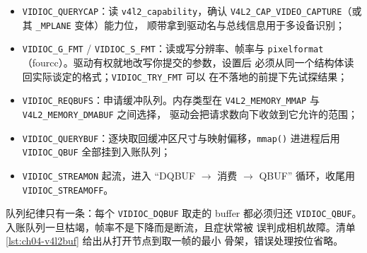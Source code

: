 \documentclass[12pt,a4paper,fontset=fandol]{ctexbook}
\newcommand{\Fn}[1]{\texttt{#1()}}
\newcommand{\Tp}[1]{\texttt{#1}}
\newcommand{\Bk}{\discretionary{}{}{}}
\begin{document}
\begin{itemize}
\item \Tp{VIDIOC\_QUERYCAP}：读 \Tp{v4l2\_capability\Bk}，确认
      \Tp{V4L2\_CAP\_VIDEO\_CAPTURE}（或其 \Tp{\_MPLANE} 变体）能力位，
      顺带拿到驱动名与总线信息用于多设备识别；
\item \Tp{VIDIOC\_G\_FMT} / \Tp{VIDIOC\_S\_FMT}：读或写分辨率、帧率与
      \Tp{pixelformat}（fourcc）。驱动有权就地改写你提交的参数，设置后
      必须从同一个结构体读回实际谈定的格式；\Tp{VIDIOC\_TRY\_FMT} 可以
      在不落地的前提下先试探结果；
\item \Tp{VIDIOC\_{\Bk}REQBUFS}：申请缓冲队列。内存类型在
      \Tp{V4L2\_{\Bk}MEMORY\_{\Bk}MMAP} 与 \Tp{V4L2\_{\Bk}MEMORY\_{\Bk}DMABUF} 之间选择，
      驱动会把请求数向下收敛到它允许的范围；
\item \Tp{VIDIOC\_{\Bk}QUERYBUF}：逐块取回缓冲区尺寸与映射偏移，\Fn{mmap}
      进进程后用 \Tp{VIDIOC\_QBUF} 全部挂到入账队列；
\item \Tp{VIDIOC\_{\Bk}STREAMON} 起流，进入 ``DQBUF $\to$ 消费 $\to$ QBUF''
      循环，收尾用 \Tp{VIDIOC\_{\Bk}STREAMOFF}。
\end{itemize}

队列纪律只有一条：每个 \Tp{VIDIOC\_DQBUF} 取走的 buffer 都必须归还
\Tp{VIDIOC\_QBUF}。入账队列一旦枯竭，帧率不是下降而是断流，且症状常被
误判成相机故障。清单 \ref{lst:ch04-v4l2buf} 给出从打开节点到取一帧的最小
骨架，错误处理按位省略。
\end{document}
